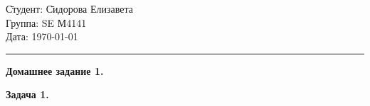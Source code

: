 \documentclass[oneside,final,14pt]{extreport}
\begin{document}
\begin{tabbing}
\hspace{11cm} \= Студент: \= Сидорова Елизавета\\
  \> Группа: \> SE М4141\\
  \> Дата: \> \today
\end{tabbing}
\hrule
\vspace{1cm}



\begin{center}{\bfseries Домашнее задание 1. \mdseries}\end{center}

\bigskip
\noindent \bfseries Задача 1. \mdseries
\bigskip

\end{document}
